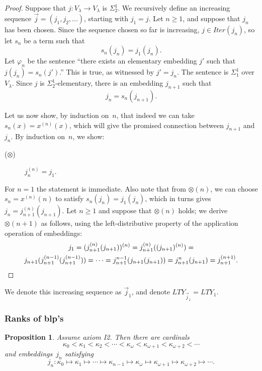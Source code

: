 \documentclass{article}
\newtheorem{proposition}[lemma]{Proposition}
\theoremstyle{definition}
\theoremstyle{remark}
\begin{document}
\begin{proof}
  Suppose that $j:V_\lambda\rightarrow V_\lambda$ is $\Sigma^1_2$. We recursively define an increasing sequence $\vec{j}=(j_1,j_2,...)$, starting with $j_1 = j$. Let $n \ge 1$, and suppose that $j_n$ has been chosen. Since the sequence chosen so far is increasing, $j\in Iter(j_n)$, so let $s_n$ be a term such that  
   \[
   s_n(j_n)=j_1(j_n).
   \]
  Let $\varphi_n$ be the sentence ``there exists an elementary embedding $j'$ such that $j(j_{n})=s_n(j')$.'' This is true, as witnessed by $j'=j_n$. The sentence is $\Sigma^1_1$ over $V_\lambda$. Since $j$ is $\Sigma^1_2$-elementary, there is an embedding $j_{n+1}$ such that 
   \[
     j_n = s_n(j_{n+1}). 
   \]
   
  \smallskip

   Let us now show, by induction on~$n$, that indeed we can take $s_n(x) = x^{(n)}(x)$, which will give the promised connection between $j_{n+1}$ and $j_n$. By induction on~$n$, we show:
   
   \begin{description}
      \item[($\otimes$)] $j_{n}^{(n)}=j_1.$
   \end{description}
     
   For $n=1$ the statement is immediate. Also note that from $\otimes(n)$, we can choose $s_n = x^{(n)}(n)$ to satisfy $s_n(j_n)=j_1(j_n)$, which in turns gives $j_{n} = j_{n+1}^{(n)}(j_{n+1})$. Let $n\ge 1$ and suppose that $\otimes(n)$ holds; we derive $\otimes(n+1)$ as follows, using the left-distributive property of the application operation of embeddings:
   \begin{multline*}
   j_1=(j_{n+1}^{(n)}(j_{n+1}))^{(n)}=   j_{n+1}^{(n)}((j_{n+1})^{(n)})= \\ j_{n+1}(j_{n+1}^{(n-1)}(j_{n+1}^{(n-1)}))= \cdots =j_{n+1}^{n-1}(j_{n+1}(j_{n+1}))=j_{n+1}^{n}(j_{n+1})=j_{n+1}^{(n+1)}. \qedhere
  \end{multline*}
\end{proof}

We denote this increasing sequence as $\vec{j}_1$, and denote $LTY_{\vec{j}_1}=LTY_1$.



\subsubsection*{Ranks of blp's}



\begin{proposition} \label{prop:I2_implies_existence_of_omega_lined}
  Assume axiom I2. Then there are cardinals 
  \[
    \kappa_0 < \kappa_1 < \kappa_2 < \cdots < \kappa_\omega < \kappa_{\omega+1} < \kappa_{\omega+2} < \cdots
  \]
  and embeddings~$j_n$ satisfying
  \[
    j_n: \kappa_0 \mapsto \kappa_1 \mapsto \cdots \mapsto \kappa_{n-1} \mapsto \kappa_\omega \mapsto \kappa_{\omega+1} \mapsto \kappa_{\omega+2} \mapsto \cdots.
  \]
\end{proposition}
\end{document}
